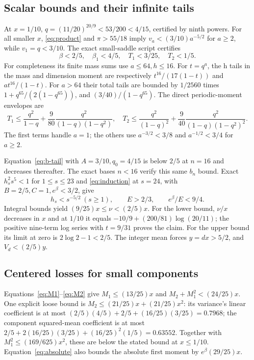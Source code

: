 \documentclass[11pt]{article}
\theoremstyle{remark}\newtheorem{remark}[theorem]{Remark}
\begin{document}
\subsection{Scalar bounds and their infinite tails}
At $x=1/10$, $q=(11/20)^{20/9}<53/200<4/15$, certified by ninth powers.
For all smaller $x$, \eqref{eq:product} and $\pi>55/18$ imply
$v_a<(3/10)a^{-5/2}$ for $a\ge2$, while $v_1=q<3/10$.
The exact small-saddle script certifies
\begin{equation}\label{eq:smallcaps}
 \beta<2/5,\quad \beta_1<4/5,\quad T_1<3/25,\quad T_2<1/5.
\end{equation}
For completeness its finite mass sums use $a\le64,h\le16$.
For $t=q^a$, the h tails in the mass and dimension moment are respectively
$t^{16}/(17(1-t))$ and $a t^{16}/(1-t)$.
For $a>64$ their total tails are bounded by
$1/2560$ times $1+q^{65}/(2(1-q^{65}))$, and
$(3/40)/(1-q^{65})$.
The direct periodic-moment envelopes are
\[
 T_1\le\frac{q^2}{1-q}
 +\frac9{80}\frac{q^2}{(1-q)(1-q^2)},\quad
 T_2\le\frac{q^2}{(1-q)^2}
 +\frac9{40}\frac{q^2}{(1-q)(1-q^2)^2}.
\]
The first terms handle $a=1$; the others use
$a^{-3/2}<3/8$ and $a^{-1/2}<3/4$ for $a\ge2$.

Equation~\eqref{eq:b-tail} with $A=3/10,q_0=4/15$ is below $2/5$ at
$n=16$ and decreases thereafter. The exact bases $n<16$ verify this same
$b_n$ bound. Exact $h_s^2s^5<1$ for $1\le s\le23$ and
\eqref{eq:induction} at $s=24$, with $B=2/5,C=1,e^\beta<3/2$, give
\[
 h_s<s^{-5/2}\ (s\ge1),\qquad E>2/3,\qquad e^\beta/E<9/4.
\]
Integral bounds yield $(9/25)x\le\nu<(2/5)x$.
For the lower bound, $\nu/x$ decreases in $x$ and at $1/10$ it equals
$-10/9+(200/81)\log(20/11)$; the positive nine-term log series with
$t=9/31$ proves the claim. For the upper bound its limit at zero is
$2\log2-1<2/5$. The integer mean forces $y=dx>5/2$, and $V_d<(2/5)y$.

\subsection{Centered losses for small components}
Equations~\eqref{eq:M1}--\eqref{eq:M2} give
$M_1\le(13/25)x$ and $M_2+M_1^2<(24/25)x$.
One explicit loose bound is $M_2\le(21/25)x+(21/25)x^2$:
its variance's linear coefficient is at most
$(2/5)(4/5)+2/5+(16/25)(3/25)=0.7968$;
the component squared-mean coefficient is at most
$2/5+2(16/25)(3/25)+(16/25)^2(1/5)=0.63552$.
Together with $M_1^2\le(169/625)x^2$, these are below the stated bound at
$x\le1/10$. Equation~\eqref{eq:absolute} also bounds the absolute first
moment by $e^\beta(29/25)x$.
\end{document}
